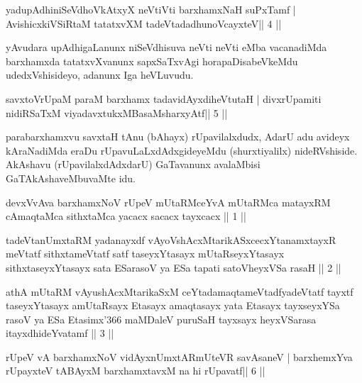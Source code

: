 \begin{shl}
yadupAdhiniSeVdhoVkAtxyX neVtiVti barxhamxNaH suPxTamf |
AvishicxkiVSiRtaM tatatxvXM tadeVtadadhunoVcayxteV\hfill || 4 ||
\end{shl}

\begin{artha}
yAvudara upAdhigaLanunx niSeVdhisuva neVti neVti eMba vacanadiMda barxhamxda tatatxvXvanunx sapxSaTxvAgi horapaDisabeVkeMdu udedxVshisideyo, adanunx Iga heVLuvudu.
\end{artha}



\begin{shl}
savxtoV\s rUpaM paraM barxhamx tadavidAyxdiheVtutaH |
divxrUpamiti nidiRSaTxM viyadavxtukxMBasaMsharxyAtf\hfill || 5 ||
\end{shl}

\begin{artha}
parabarxhamxvu savxtaH tAnu (bAhayx) rUpavilalxdudx, AdarU adu avideyx kAraNadiMda eraDu rUpavuLaLxdAdxgideyeMdu (shurxtiyalilx)  nideRVshiside. AkAshavu (rUpavilalxdAdxdarU) GaTavanunx avalaMbisi GaTAkAshaveMbuvaMte idu.
\end{artha}



\medskip
{}

\begin{kandikeshl}
devxVvAva barxhamxNoV rUpeV mUtaRMceYvA mUtaRMca
matayxRM cAmaqtaMca sithxtaMca yacacx sacacx tayxcacx || 1 ||

tadeVtanUmxtaRM yadanayxdf vAyoVshAcxMtarikASxcecxYtanamxtayxR
meVtatf sithxtameVtatf satf taseyxYtasayx mUtaRseyxYtasayx
sithxtaseyxYtasayx sata ESarasoV ya ESa tapati satoVheyxVSa rasaH || 2 || 

athA mUtaRM vAyushAcxMtarikaSxM ceYtadamaqtameVtadfyadeVtatf 
tayxtf taseyxYtasayx amUtaRsayx Etasayx amaqtasayx yata Etasayx tayxseyxYSa
rasoV ya ESa Etasimx\char'366 maMDaleV puruSaH tayxsayx heyxVSarasa
itayxdhideYvatamf || 3 ||
\end{kandikeshl}


\begin{shl}
rUpeV vA barxhamxNoV vidAyxnUmxtARmUteVR savAsaneV |
barxhemxYva rUpayxteV tABAyxM barxhamxtavxM na hi rUpavatf\hfill || 6 ||
\end{shl}

